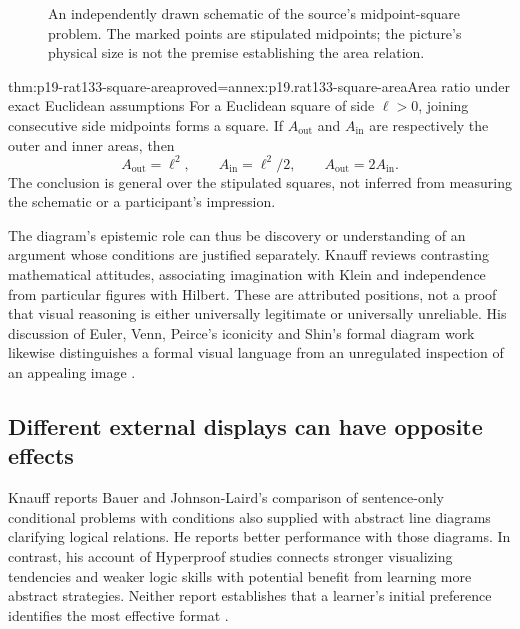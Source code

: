 \begin{figure}[htbp]
\centering
{}
\caption{An independently drawn schematic of the source's midpoint-square
problem. The marked points are stipulated midpoints; the picture's physical
size is not the premise establishing the area relation.}
\label{fig:p19-rat133-midpoint-square}
\end{figure}

\begin{hblemma}{thm:p19-rat133-square-area}{proved=annex:p19.rat133-square-area}{Area ratio under exact Euclidean assumptions}
For a Euclidean square of side \(\ell>0\), joining consecutive side
midpoints forms a square. If \(A_{\mathrm{out}}\) and
\(A_{\mathrm{in}}\) are respectively the outer and inner areas, then
\[
             A_{\mathrm{out}}=\ell^2,
\qquad       A_{\mathrm{in}}=\ell^2/2,
\qquad       A_{\mathrm{out}}=2A_{\mathrm{in}}.
\]
The conclusion is general over the stipulated squares, not inferred from
measuring the schematic or a participant's impression.
\end{hblemma}

The diagram's epistemic role can thus be discovery or understanding of an
argument whose conditions are justified separately. Knauff reviews contrasting
mathematical attitudes, associating imagination with Klein and independence
from particular figures with Hilbert. These are attributed positions, not a
proof that visual reasoning is either universally legitimate or universally
unreliable. His discussion of Euler, Venn, Peirce's iconicity and Shin's
formal diagram work likewise distinguishes a formal visual language from an
unregulated inspection of an appealing image
\parencite[pp.~735--736]{Knauff2021VisualizationRationality}.

\subsection{Different external displays can have opposite effects}

Knauff reports Bauer and Johnson-Laird's comparison of sentence-only
conditional problems with conditions also supplied with abstract line diagrams
clarifying logical relations. He reports better performance with those
diagrams. In contrast, his account of Hyperproof studies connects stronger
visualizing tendencies and weaker logic skills with potential benefit from
learning more abstract strategies. Neither report establishes that a learner's
initial preference identifies the most effective format
\parencite[pp.~736--737]{Knauff2021VisualizationRationality}.

